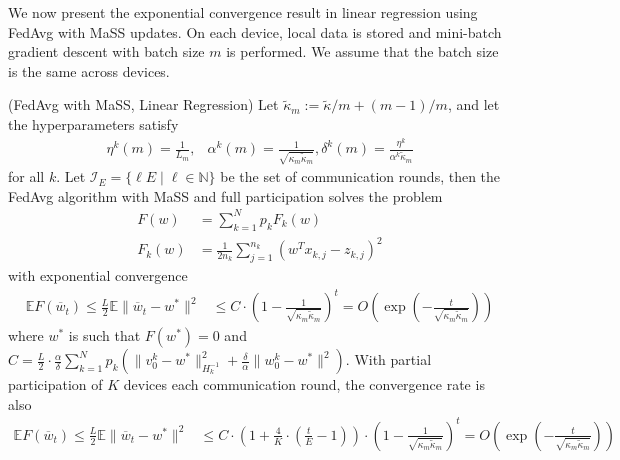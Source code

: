 We now present the exponential convergence result in linear regression
using FedAvg with MaSS updates. On each device, local data is stored
and mini-batch gradient descent with batch size $m$ is performed.
We assume that the batch size is the same across devices. 
\begin{theorem}
(FedAvg with MaSS, Linear Regression) Let $\tilde{\kappa}_{m}:=\tilde{\kappa}/m+(m-1)/m$,
and let the hyperparameters satisfy 
\begin{align*}
\eta^{k}(m)=\frac{1}{L_{m}}, & \alpha^{k}(m)=\frac{1}{\sqrt{\kappa_{m}\tilde{\kappa}_{m}}},\delta^{k}(m)=\frac{\eta^{k}}{\alpha^{k}\tilde{\kappa}_{m}}
\end{align*}
for all $k$. Let $\mathcal{I}_{E}=\{\ell E\mid\ell\in\mathbb{N}\}$
be the set of communication rounds, then the FedAvg algorithm with
MaSS and full participation solves the problem 
\begin{align*}
F(w) & =\sum_{k=1}^{N}p_{k}F_{k}(w)\\
F_{k}(w) & =\frac{1}{2n_{k}}\sum_{j=1}^{n_{k}}(w^{T}x_{k,j}-z_{k,j})^{2}
\end{align*}
with exponential convergence
\begin{align*}
\mathbb{E}F(\overline{w}_{t})\leq\frac{L}{2}\mathbb{E}\|\overline{w}_{t}-w^{\ast}\|^{2} & \leq C\cdot(1-\frac{1}{\sqrt{\kappa_{m}\tilde{\kappa}_{m}}})^{t}=O(\exp(-\frac{t}{\sqrt{\kappa_{m}\tilde{\kappa}_{m}}}))
\end{align*}
 where $w^{\ast}$ is such that $F(w^{\ast})=0$ and $C=\frac{L}{2}\cdot\frac{\alpha}{\delta}\sum_{k=1}^{N}p_{k}(\|v_{0}^{k}-w^{\ast}\|_{H_{k}^{-1}}^{2}+\frac{\delta}{\alpha}\|w_{0}^{k}-w^{\ast}\|^{2})$.
With partial participation of $K$ devices each communication round,
the convergence rate is also 
\begin{align*}
\mathbb{E}F(\overline{w}_{t})\leq\frac{L}{2}\mathbb{E}\|\overline{w}_{t}-w^{\ast}\|^{2} & \leq C\cdot(1+\frac{4}{K}\cdot(\frac{t}{E}-1))\cdot(1-\frac{1}{\sqrt{\kappa_{m}\tilde{\kappa}_{m}}})^{t}=O(\exp(-\frac{t}{\sqrt{\kappa_{m}\tilde{\kappa}_{m}}}))
\end{align*}
\end{theorem}
